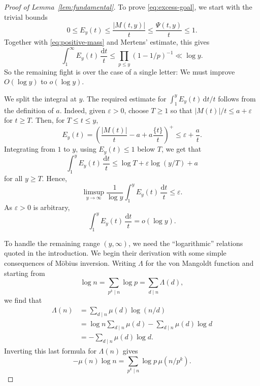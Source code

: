 \documentclass[11pt]{amsart}
\theoremstyle{remark}
\newcommand{\eps}{\varepsilon}
\newcommand{\dt}{\,\frac{\mathrm{d}t}{t}}
\newcommand{\pos}[1]{\left(#1\right)^+}
\begin{document}
\begin{proof}[Proof of Lemma~\ref{lem:fundamental}]
To prove \eqref{eq:excess-goal}, we start with the trivial bounds
\[
0\le E_y(t)\le\frac{|M(t,y)|}t\le\frac{\Psi(t,y)}t\le1.
\]
Together with \eqref{eq:positive-mass} and Mertens' estimate, this
gives
\begin{equation}\label{eq:excess-bigO}
\int_1^\infty E_y(t)\dt
\le\prod_{p\le y}(1-1/p)^{-1}\ll\log y.
\end{equation}
So the remaining fight is over the case of a single letter: We must improve $O(\log y)$ to $o(\log y)$.

We split the integral at $y$. The required estimate for $\int_1^{y} E_y(t)\,\mathrm{d}t/t$ follows from the definition of
$a$. Indeed, given $\eps>0$, choose $T\ge1$ so that $|M(t)|/t\le a+\eps$
for $t\ge T$. Then, for $T\le t\le y$,
\[
E_y(t)
=\pos{\frac{|M(t)|}t-a+a\frac{\{t\}}t}
\le\eps+\frac at.
\]
Integrating from $1$ to $y$, using $E_y(t)\le1$ below $T$, we get that
\[
\int_1^yE_y(t)\dt
\le\log T+\eps\log(y/T)+a
\]
for all $y\ge T$. Hence,
\[  \limsup_{y\to\infty} \frac{1}{\log{y}}\int_1^yE_y(t)\dt \le \eps.\]
As $\eps > 0$ is arbitrary,
\begin{equation}\label{eq:below}
\int_1^yE_y(t)\dt=o(\log y).
\end{equation}

To handle the remaining range $(y,\infty)$, we need the ``logarithmic'' relations quoted in the introduction. We begin their derivation with some simple consequences of M\"{o}bius inversion. Writing $\Lambda$ for the von Mangoldt function and starting from
\begin{equation}\label{eq:chebyshevlog} \log{n} = \sum_{p^k \mid n} \log{p} = \sum_{d \mid n} \Lambda(d),  \end{equation}
we find that
\begin{align*} \Lambda(n) &= \sum_{d\mid n} \mu(d)\log{(n/d)}
\\&= \log{n} \sum_{d\mid n} \mu(d) - \sum_{d \mid n}\mu(d)\log{d}\\
&=- \sum_{d \mid n}\mu(d)\log{d}. \end{align*}
Inverting this last formula for $\Lambda(n)$ gives
\begin{equation}\label{eq:muchebyshev}
-\mu(n)\log n=\sum_{p^k\mid n}\log p\,\mu(n/p^k).
\end{equation}


\end{proof}
\end{document}
